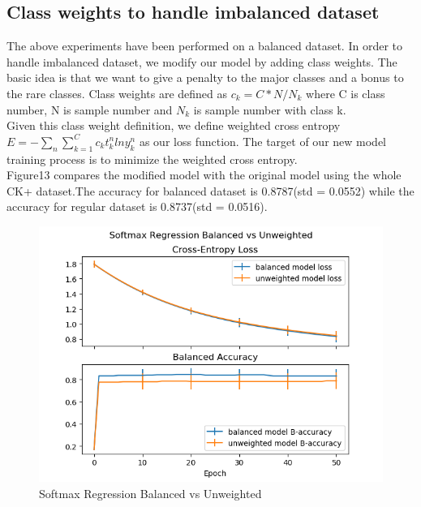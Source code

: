 \documentclass{article} %
\begin{document}
\subsection {Class weights to handle imbalanced dataset}
The above experiments have been performed on a balanced dataset. In order to handle imbalanced dataset, we modify our model by adding class weights. The basic idea is that we want to give a penalty to the major classes and a bonus to the rare classes. Class weights are defined as $c_k = C*N/N_k$ where C is class number, N is sample number and $N_k$ is sample number with class k. \\
Given this class weight definition, we define weighted cross entropy $E = -\sum_{n}\sum_{k=1}^{C} c_k t_k^n ln y_k^n $ as our loss function. The target of our new model training process is to minimize the weighted cross entropy. \\
Figure13 compares the modified model with the original model using the whole CK+ dataset.The accuracy for balanced dataset is 0.8787(std = 0.0552) while the accuracy for regular dataset is 0.8737(std = 0.0516).
\begin{figure}[h]
	\centering
	\includegraphics[scale=0.5]{./graph/unbalanced.png}
	\caption{Softmax Regression Balanced vs Unweighted}
\end{figure}
\end{document}
